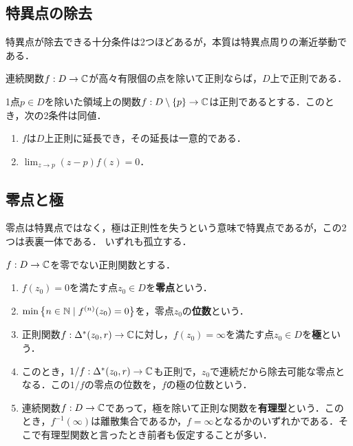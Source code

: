 \documentclass[uplatex, dvipdfmx]{jsreport}
\begin{document}
\subsection{特異点の除去}

\begin{tcolorbox}[colframe=ForestGreen, colback=ForestGreen!10!white,breakable,colbacktitle=ForestGreen!40!white,coltitle=black,fonttitle=\bfseries\sffamily,
title=]
    特異点が除去できる十分条件は2つほどあるが，本質は特異点周りの漸近挙動である．
\end{tcolorbox}

\begin{corollary}[連続性による除去]
    連続関数$f:D\to\mathbb{C}$が高々有限個の点を除いて正則ならば，$D$上で正則である．
\end{corollary}

\begin{corollary}[除去可能特異点の特徴付け]
    1点$p\in D$を除いた領域上の関数$f:D\setminus\{p\}\to\mathbb{C}$は正則であるとする．このとき，次の2条件は同値．
    \begin{enumerate}
        \item $f$は$D$上正則に延長でき，その延長は一意的である．
        \item $\lim_{z\to p}(z-p)f(z)=0$．
    \end{enumerate}
\end{corollary}

\subsection{零点と極}

\begin{tcolorbox}[colframe=ForestGreen, colback=ForestGreen!10!white,breakable,colbacktitle=ForestGreen!40!white,coltitle=black,fonttitle=\bfseries\sffamily,
title=]
    零点は特異点ではなく，極は正則性を失うという意味で特異点であるが，この2つは表裏一体である．
    いずれも孤立する．
\end{tcolorbox}

\begin{definition}
    $f:D\to\mathbb{C}$を零でない正則関数とする．
    \begin{enumerate}
        \item $f(z_0)=0$を満たす点$z_0\in D$を\textbf{零点}という．
        \item $\min\left\{n\in\mathbb{N}\mid f^{(n)}(z_0)=0\right\}$を，零点$z_0$の\textbf{位数}という．
        \item 正則関数$f:\Delta^*(z_0,r)\to\mathbb{C}$に対し，$f(z_0)=\infty$を満たす点$z_0\in D$を\textbf{極}という．
        \item このとき，$1/f:\Delta^*(z_0,r)\to\mathbb{C}$も正則で，$z_0$で連続だから除去可能な零点となる．この$1/f$の零点の位数を，$f$の極の位数という．
        \item 連続関数$f:D\to\mathbb{C}$であって，極を除いて正則な関数を\textbf{有理型}という．このとき，$f^{-1}(\infty)$は離散集合であるか，$f=\infty$となるかのいずれかである．そこで有理型関数と言ったとき前者も仮定することが多い．
    \end{enumerate}
\end{definition}
\end{document}
